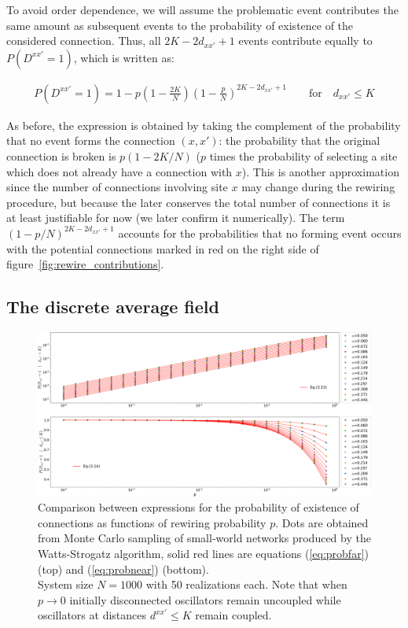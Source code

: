 To avoid order dependence, we will assume the problematic event contributes the same amount as subsequent events to the probability of
existence of the considered connection. Thus, all $2K-2d_{xx'}+1$ events contribute equally to $P(D^{xx'}=1)$, which is written as:

\begin{align}
  P(D^{xx'}=1) = 1 - p\left(1-\frac{2K}{N}\right)\left(1-\frac{p}{N}\right)^{2K - 2d_{xx'} + 1} \qquad \text{for} \quad d_{xx'} \leq K
  \label{eq:probnear}
\end{align}

\noindent As before, the expression is obtained by taking the complement of the probability that no event forms the connection
$(x,x')$: the probability that the original connection is broken is $p(1-2K/N)$ ($p$ times the probability of selecting a site which
does not already have a connection with $x$). This is another approximation since the number of connections involving site $x$ may
change during the rewiring procedure, but because the later conserves the total number of connections it is at least justifiable for
now (we later confirm it numerically). The term $(1-p/N)^{2K-2d_{xx'}+1}$ accounts for the probabilities that no forming event occurs
with the potential connections marked in {\color{red}red} on the right side of figure~\ref{fig:rewire_contributions}.

\subsection{The discrete average field}
\label{subsection:justifyapproximations}

\begin{figure}
  \centering
  \includegraphics[width=\linewidth]{fig/rewire_mc.png}
	\caption{Comparison between expressions for the probability of existence of connections as functions of rewiring probability $p$.
		Dots are obtained from Monte Carlo sampling of small-world networks produced by the Watts-Strogatz algorithm, solid red lines are
		equations (\ref{eq:probfar}) (top) and (\ref{eq:probnear}) (bottom). \\ System size $N=1000$ with 50 realizations each. Note that
		when $p\to 0$ initially disconnected oscillators remain uncoupled while oscillators at distances $d^{xx'}\leq K$ remain coupled.}

  \label{fig:rewire_mc}
\end{figure}

